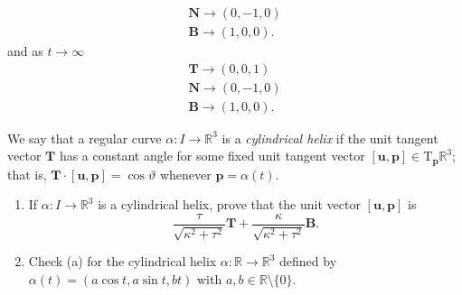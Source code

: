 \documentclass[12 pt, letterpaper]{hmcpset}
\begin{document}
\begin{solution}
\begin{enumerate}
\[{\begin{gathered}
						\mathbf{N} \to (0, -1, 0) \\
						\mathbf{B} \to (1, 0, 0).
					\end{gathered}
				}
			\]
			and as $t \to \infty$
			\[
				\boxed{
					\begin{gathered}
						\mathbf{T} \to (0, 0, 1) \\
						\mathbf{N} \to (0, -1, 0) \\
						\mathbf{B} \to (1, 0, 0).
					\end{gathered}
				}
			\]
	\end{enumerate}
\end{solution}

\pagebreak

\begin{problem}[Problem 2.]
	We say that a regular curve $\alpha : I \to \mathbb{R}^{3}$ is a \textit{cylindrical helix} if the unit tangent vector $\mathbf{T}$ has a constant angle for some fixed unit tangent vector $[\mathbf{u}, \mathbf{p}] \in \mathrm{T}_{\mathbf{p}}\mathbb{R}^{3}$; that is, $\mathbf{T} \cdot [\mathbf{u}, \mathbf{p}] = \cos{\vartheta}$ whenever $\mathbf{p} = \alpha(t)$.
	\begin{enumerate}
		\item If $\alpha : I \to \mathbb{R}^{3}$ is a cylindrical helix, prove that the unit vector $[\mathbf{u}, \mathbf{p}]$ is
			\[
				\frac{\tau}{\sqrt{\kappa^{2} + \tau^{2}}} \mathbf{T} + \frac{\kappa}{\sqrt{\kappa^{2} + \tau^{2}}} \mathbf{B}.
			\]
		\item Check (a) for the cylindrical helix $\alpha : \mathbb{R} \to \mathbb{R}^{3}$ defined by $\alpha(t) = (a \cos{t}, a \sin{t}, bt)$ with $a, b \in \mathbb{R} \setminus \{ 0 \}$.
	\end{enumerate}
\end{problem}
\end{document}
